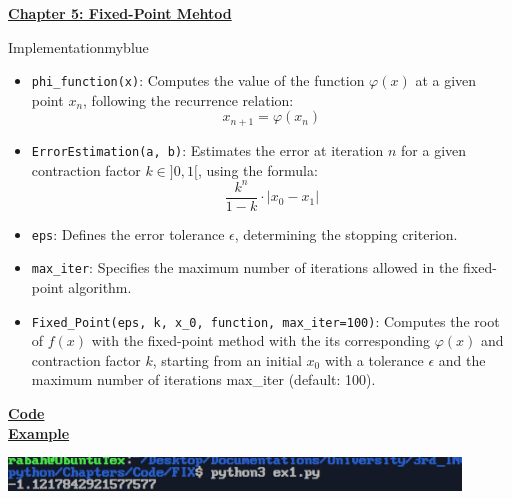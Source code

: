\newpage
\begin{center}
    \Huge{\textbf{\underline{Chapter 5: Fixed-Point Mehtod}}}
\end{center}

\vspace{0.77cm}
\setcounter{section}{0}

\begin{prettyBox}{Implementation}{myblue}
\begin{itemize}
\item \texttt{phi\_function(x)}: Computes the value of the function \( \varphi(x) \) at a
given point \( x_n \), following the recurrence relation:  
          \[
          x_{n+1} = \varphi(x_n)
          \]
\item \texttt{ErrorEstimation(a, b)}: Estimates the error at iteration \(n\) for a given 
contraction factor \( k \in ]0,1[\), using the formula:  
          \[
          \dfrac{k^n}{1-k} \cdot |x_0 - x_1|
          \]

    \item \texttt{eps}: Defines the error tolerance \( \epsilon \), determining the stopping
    criterion.

    \item \texttt{max\_iter}: Specifies the maximum number of iterations allowed in the 
fixed-point algorithm.

\item \texttt{Fixed\_Point(eps, k, x\_0, function, max\_iter=100)}: Computes the root of \( f(x) \) with the fixed-point method with the  
its corresponding \( \varphi(x) \) and contraction factor \( k \), starting from an
initial \( x_0 \) with a tolerance \( \epsilon \) and the maximum number of iterations max\_iter (default: 100).
\end{itemize}
\end{prettyBox}
\vspace{0.5cm}
\textbf{\underline{Code}}\\[0.05cm]


\newpage
\textbf{\underline{Example}}\\[0.1cm]


\vspace{0.5cm}

\begin{center}
    \includegraphics[width = 0.9\textwidth]{Chapters/ScreenShot/FIX/fix.png}
\end{center}

